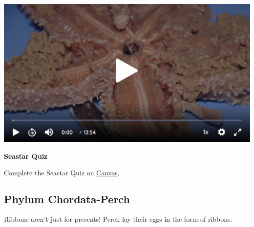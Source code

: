 \documentclass[
]{book}
\begin{document}
\includegraphics{images/Lab8_Seastar_Dissection_Video2.png}

\textbf{Seastar Quiz}

Complete the Seastar Quiz on \href{https://canvas.ubc.ca/}{Canvas}.

\hypertarget{phylum-chordata-perch-1}{%
\subsection*{Phylum Chordata-Perch}\label{phylum-chordata-perch-1}}

Ribbons aren't just for presents! Perch lay their eggs in the form of ribbons.
\end{document}
